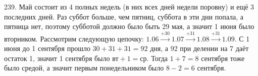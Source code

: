 239. Май состоит из 4 полных недель (в них всех дней недели поровну) и ещё 3 последних дней. Раз суббот больше, чем пятниц, суббота в эти дни попала, а пятница нет, поэтому субботой должно было быть 29 мая, а значит 1 июня было вторником. Рассмотрим следующую цепочку:
$1.06\stackrel{+30}{\rightarrow}1.07\stackrel{+31}{\rightarrow}1.08\stackrel{+31}{\rightarrow}1.09.$ С 1 июня до 1 сентября прошло $30+31+31=92$ дня, а 92 при делении на 7 даёт остаток 1, значит 1 сентября было $\text{вт}+1=\text{ср}.$ Тогда $1+7=8$ сентября тоже было средой, а значит первым понедельником было $8-2=6$ сентября.\\
